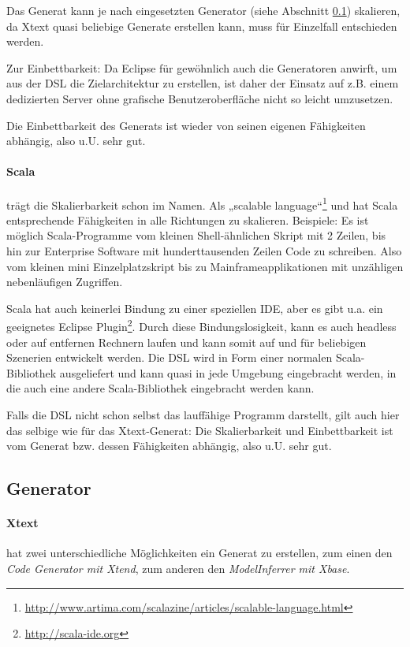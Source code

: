 Das Generat kann je nach eingesetzten Generator (siehe Abschnitt
\ref{sec-generator}) skalieren, da Xtext quasi beliebige Generate erstellen
kann, muss für Einzelfall entschieden werden.

Zur Einbettbarkeit:
Da Eclipse für gewöhnlich auch die Generatoren anwirft, um aus der DSL
die Zielarchitektur zu erstellen,
ist daher der Einsatz auf z.B. einem dedizierten Server ohne grafische
Benutzeroberfläche nicht so leicht umzusetzen.

Die Einbettbarkeit des Generats ist wieder von seinen eigenen Fähigkeiten
abhängig, also u.U. sehr gut.

\paragraph{Scala} trägt die Skalierbarkeit schon im Namen. 
Als „scalable language“\footnote{
\url{http://www.artima.com/scalazine/articles/scalable-language.html}}
und hat Scala entsprechende Fähigkeiten in alle Richtungen
zu skalieren. Beispiele: Es ist möglich Scala-Programme vom kleinen
Shell-ähnlichen Skript mit 2 Zeilen, bis hin zur Enterprise Software
mit hunderttausenden Zeilen Code zu schreiben. Also vom kleinen mini
Einzelplatzskript bis zu Mainframeapplikationen mit unzähligen nebenläufigen
Zugriffen.

Scala hat auch keinerlei Bindung zu einer speziellen IDE, aber es gibt
u.a. ein geeignetes Eclipse Plugin\footnote{ \url{http://scala-ide.org}}.
Durch diese Bindungslosigkeit, kann
es auch headless oder auf entfernen Rechnern laufen und kann somit auf und für
beliebigen Szenerien entwickelt werden.
Die DSL wird in Form einer normalen Scala-Bibliothek ausgeliefert und
kann quasi in jede Umgebung eingebracht werden, in die auch eine andere
Scala-Bibliothek eingebracht werden kann.

Falls die DSL nicht schon selbst das lauffähige Programm darstellt, gilt
auch hier das selbige wie für das Xtext-Generat: Die Skalierbarkeit und
Einbettbarkeit ist vom Generat bzw. dessen Fähigkeiten abhängig, also u.U.
sehr gut.


\subsection{Generator}\label{sec-generator}

\paragraph{Xtext} hat zwei unterschiedliche Möglichkeiten ein
Generat zu erstellen, zum einen den \emph{Code Generator mit Xtend},
zum anderen den \emph{ModelInferrer mit Xbase}.

